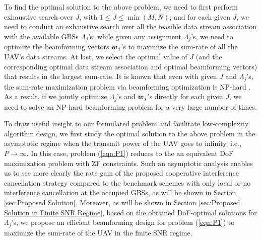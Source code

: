 \documentclass[onecolumn, draftclsnofoot, 12pt]{IEEEtran}
\newcommand{\mv}[1]{\mbox{\boldmath{$ #1 $}}}
\begin{document}
To find the optimal solution to the above problem, we need to first perform exhaustive search over $J$, with $1\leq J \leq \min(M,N)$; and for each given $J$, we need to conduct an exhaustive search over all the feasible data stream association with the available GBSs $\Lambda_j$'s; while given any assignment $\Lambda_j$'s, we need to optimize the beamforming vectors $\mv{w}_j$'s to maximize the sum-rate of all the UAV's data streams. At last, we select the optimal value of $J$ (and the corresponding optimal data stream association and optimal beamforming vectors) that results in the largest sum-rate. It is known that even with given $J$ and $\Lambda_j$'s, the sum-rate maximization problem via beamforming optimization is NP-hard \cite{beamforming}. As a result, if we jointly optimize $\Lambda_j$'s and $\mv{w}_j$'s directly for each given $J$, we need to solve an NP-hard beamforming problem for a very large number of times.

To draw useful insight to our formulated problem and facilitate low-complexity algorithm design, we first study the optimal solution to the above problem in the asymptotic regime when the transmit power of the UAV goes to infinity, i.e., $P\rightarrow \infty$. In this case, problem (\ref{eqn:P1}) reduces to the an equivalent DoF maximization problem with ZF constraints. Such an asymptotic analysis enables us to see more clearly the rate gain of the proposed cooperative interference cancellation strategy compared to the benchmark schemes with only local or no interference cancellation at the occupied GBSs, as will be shown in Section \ref{sec:Proposed Solution}. Moreover, as will be shown in Section \ref{sec:Proposed Solution in Finite SNR Regime}, based on the obtained DoF-optimal solutions for $\Lambda_j$'s, we propose an efficient beamforming design for problem (\ref{eqn:P1}) to maximize the sum-rate of the UAV in the finite SNR regime.
\end{document}

